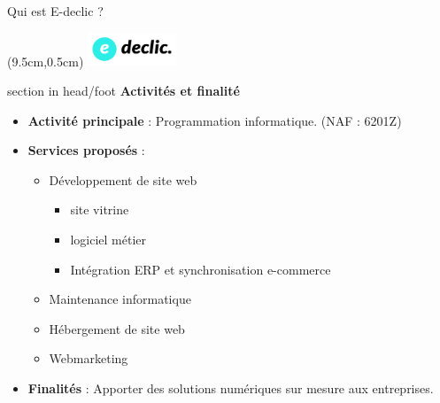 \documentclass{beamer}
\newcommand{\logoEdeclic}{
	\begin{textblock*}{2cm}(9.5cm,0.5cm)
  		\includegraphics[height=1cm]{../img/logo_e-declic.png}
	\end{textblock*}
}
\begin{document}
\begin{frame}{Qui est E-declic ?}
	\logoEdeclic

	\begin{beamercolorbox}[wd=\paperwidth,ht=1.5em,dp=0.5em,leftskip=0.5cm]{section in head/foot}
  		\large \textbf{Activités et finalité}
	\end{beamercolorbox}
	\vspace{0.5em}
	\begin{center}
  		\begin{minipage}{0.9\textwidth}
			\begin{itemize}
  				\item<1-> \textbf{Activité principale} : Programmation informatique. (NAF : 6201Z)
  				\item<2-> \textbf{Services proposés} :
  				\begin{itemize}
  					\item Développement de site web
  					\begin{itemize}
  						\item site vitrine
  						\item logiciel métier
  						\item Intégration ERP et synchronisation e-commerce
  					\end{itemize}
  					\item Maintenance informatique
  					\item Hébergement de site web
  					\item Webmarketing
  				\end{itemize}
  				\item<3-> \textbf{Finalités} : Apporter des solutions numériques sur mesure aux entreprises.
  			\end{itemize}
  		\end{minipage}
	\end{center}
	\vfill
\end{frame}
\end{document}
